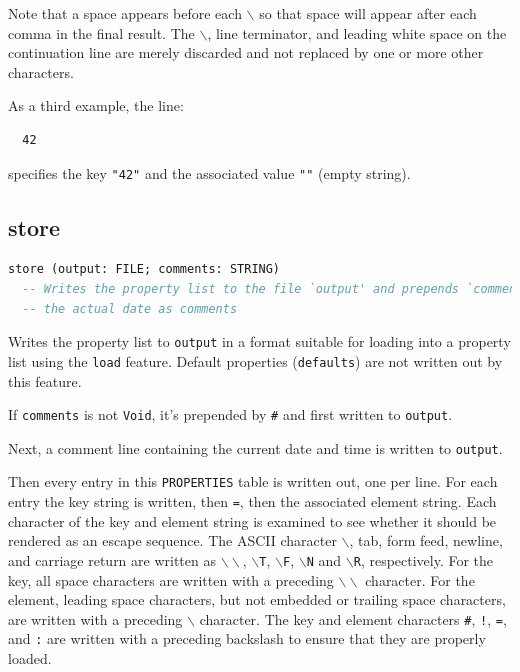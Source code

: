 \documentclass[a4paper,fleqn]{report}
\begin{document}
Note that a space appears before each \texttt{$\backslash$} so that
space will appear after each comma in the final result. The
\texttt{$\backslash$}, line terminator, and leading white space on the
continuation line are merely discarded and not replaced by one or more
other characters.

As a third example, the line:

\begin{lstlisting}
  42  
\end{lstlisting}

specifies the key \texttt{"42"} and the associated value \texttt{""}
(empty string).


\subsection{store}
\label{sec:store}

\begin{lstlisting}[language=Eiffel]
store (output: FILE; comments: STRING)
  -- Writes the property list to the file `output' and prepends `comment' and
  -- the actual date as comments
\end{lstlisting}

Writes the property list to \texttt{output} in a format suitable for
loading into a property list using the \texttt{load} feature. Default
properties (\texttt{defaults}) are not written out by this feature.

If \texttt{comments} is not \texttt{Void}, it's prepended by
\texttt{\#} and first written to \texttt{output}.

Next, a comment line containing the current date and time is written
to \texttt{output}.

Then every entry in this \texttt{PROPERTIES} table is written out, one
per line. For each entry the key string is written, then \texttt{=},
then the associated element string. Each character of the key and
element string is examined to see whether it should be rendered as an
escape sequence. The ASCII character \texttt{$\backslash$}, tab, form
feed, newline, and carriage return are written as
\texttt{$\backslash\backslash$}, \texttt{$\backslash$T},
\texttt{$\backslash$F}, \texttt{$\backslash$N} and
\texttt{$\backslash$R}, respectively. For the key, all space
characters are written with a preceding
\texttt{$\backslash\backslash$} character. For the element, leading
space characters, but not embedded or trailing space characters, are
written with a preceding \texttt{$\backslash$} character. The key and
element characters \texttt{\#}, \texttt{!}, \texttt{=}, and \texttt{:}
are written with a preceding backslash to ensure that they are
properly loaded.
\end{document}
